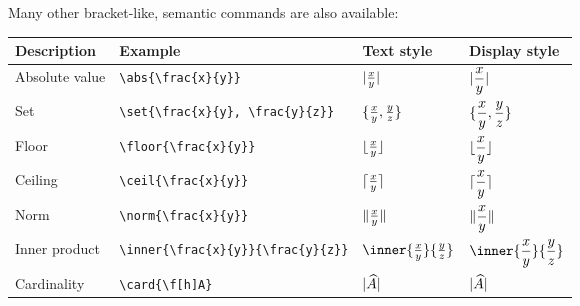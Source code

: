 \documentclass{article}
\begin{document}
Many other bracket-like, semantic commands are also available:

\begin{center}
\begin{tabular}{@{}llll@{}}
\toprule
Description				& Example 					& Text style 				& Display style \\ \midrule
Absolute value 			& \verb!\abs{\frac{x}{y}}!        	& $\lvert\frac{x}{y}\rvert$ 		& $\displaystyle\lvert\frac{x}{y}\rvert$ \\[10pt]
Set 					& \verb!\set{\frac{x}{y}, \frac{y}{z}}!        & $\{\frac{x}{y}, \frac{y}{z}\}$ 	& $\displaystyle\{\frac{x}{y}, \frac{y}{z}\}$ \\[10pt]
Floor					& \verb!\floor{\frac{x}{y}}!        	& $\lfloor\frac{x}{y}\rfloor$ 		& $\displaystyle\lfloor\frac{x}{y}\rfloor$ \\[10pt]
Ceiling 				& \verb!\ceil{\frac{x}{y}}!        	& $\lceil\frac{x}{y}\rceil$ 		& $\displaystyle\lceil\frac{x}{y}\rceil$ \\[10pt]
Norm					& \verb!\norm{\frac{x}{y}}!       	& $\lVert\frac{x}{y}\rVert$ 	& $\displaystyle\lVert\frac{x}{y}\rVert$ \\[10pt]
Inner product			& \verb!\inner{\frac{x}{y}}{\frac{y}{z}}!       	& $\inner{\frac{x}{y}}{\frac{y}{z}}$ 	& $\displaystyle\inner{\frac{x}{y}}{\frac{y}{z}}$ \\[10pt]
Cardinality 				& \verb!\card{\f[h]A}!       		& $\card{\f[h]A}$ 			& $\displaystyle\card{\f[h]A}$ \\[10pt]
\bottomrule
\end{tabular}
\end{center}

%
\end{document}
